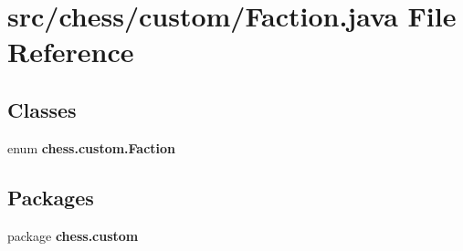 \section{src/chess/custom/\+Faction.java File Reference}
\label{_faction_8java}
\subsection*{Classes}
\begin{DoxyCompactItemize}
\item 
enum {\bf chess.\+custom.\+Faction}
\end{DoxyCompactItemize}
\subsection*{Packages}
\begin{DoxyCompactItemize}
\item 
package {\bf chess.\+custom}
\end{DoxyCompactItemize}
